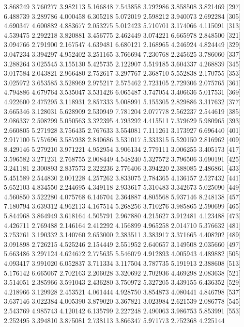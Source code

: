 \documentclass[12pt]{article}
\begin{document}
\begin{Schunk}
\begin{Soutput}
[289] 3.868249 3.760277 3.982113 5.166848 7.543858 3.792986 3.858508 3.821469
[297] 6.488739 3.289786 4.000458 6.305218 5.072019 2.598212 3.940073 2.692284
[305] 4.690347 4.600882 4.883677 2.053275 5.012423 5.710701 3.174066 4.115091
[313] 4.539475 2.292218 3.820881 3.456775 2.462449 3.074221 6.665978 2.848500
[321] 3.094766 2.791900 2.167547 4.639481 6.680121 2.168965 4.246924 4.824449
[329] 3.047234 3.394297 4.952402 3.251165 3.766694 7.230768 2.245625 3.786060
[337] 3.288264 3.025545 3.155130 5.425735 2.122907 5.519185 3.604337 4.268839
[345] 3.017584 2.043821 2.966480 2.752617 3.297767 2.368710 5.552838 2.170755
[353] 3.025972 3.653585 3.528969 2.975217 2.575462 2.723105 2.729306 2.075765
[361] 4.794886 4.679764 3.535047 3.531426 6.065487 3.747054 3.406636 5.017531
[369] 4.922600 2.475295 3.118931 2.857333 5.008991 5.155305 2.829886 3.317632
[377] 3.665346 3.128031 5.628909 2.530949 7.781204 2.077778 2.562237 2.544619
[385] 2.086337 2.508299 5.050563 3.322395 4.793292 4.415511 7.379629 5.980965
[393] 2.660805 5.271928 3.756435 2.767633 3.554081 7.111261 3.173927 6.696440
[401] 2.917100 5.757696 3.587938 2.840686 3.531017 5.333315 5.520150 2.816962
[409] 8.429146 5.279210 3.971221 4.952954 3.906134 2.779111 3.006255 3.405173
[417] 3.596582 3.271231 2.768755 2.008449 4.548240 5.327572 3.796506 3.690191
[425] 3.241181 2.300893 2.837573 2.322236 2.776406 3.394220 2.388085 2.486861
[433] 5.451589 2.544830 2.001228 4.257262 3.833075 2.784365 4.136157 2.527432
[441] 5.652103 4.834550 2.244695 4.349118 2.933617 5.310483 3.342673 5.025090
[449] 4.560850 3.522280 4.075768 6.146704 2.364887 4.805568 5.937146 8.248138
[457] 7.180794 3.639312 4.962113 4.167514 5.268256 3.710276 3.985865 2.590699
[465] 5.844968 3.864949 3.618164 4.505791 2.967880 4.215627 3.912481 4.123488
[473] 4.426711 2.769488 2.146164 2.412292 4.156899 4.965258 2.014710 5.376632
[481] 3.753761 3.190332 3.140760 2.653000 2.383511 3.383917 3.371665 4.408202
[489] 3.091898 2.726215 4.525246 2.154449 2.551952 2.640657 3.149508 2.035660
[497] 5.663486 3.297124 4.624672 2.775635 5.546079 4.912893 4.005943 4.489882
[505] 4.093417 3.991020 6.052837 3.711334 3.117504 3.787735 5.191913 2.388608
[513] 5.176142 6.665067 2.702163 2.206028 3.320692 2.702936 4.469298 2.083638
[521] 3.514051 2.385966 3.591043 2.436280 3.750972 5.327205 3.439155 6.436352
[529] 4.218966 3.129928 2.453521 4.061444 4.928750 3.854873 4.080441 4.846798
[537] 3.637146 3.022384 4.005390 3.879020 3.367821 3.023984 2.621539 2.086778
[545] 2.543769 4.985743 4.120142 6.135799 2.227248 2.490063 3.986753 5.853991
[553] 2.252495 3.394810 3.875081 2.738113 3.866347 5.971773 2.752368 4.225144

\end{Soutput}
\end{Schunk}
\end{document}
